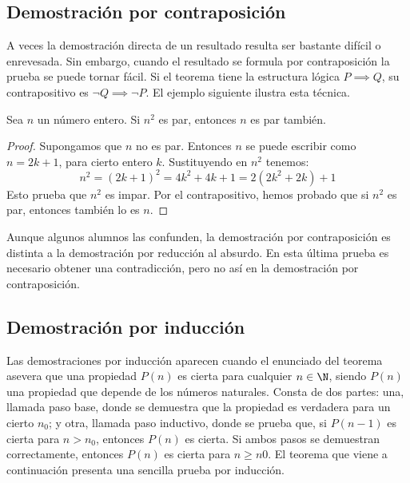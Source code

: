 \subsection{Demostración por contraposición}

A veces la demostración directa de un resultado resulta ser bastante difícil o enrevesada.
Sin embargo, cuando el resultado se formula por contraposición la prueba se puede tornar fácil.
Si el teorema tiene la estructura lógica $P \implies Q$, su contrapositivo es $\neg Q \implies \neg P$.
El ejemplo siguiente ilustra esta técnica.

\begin{theorem}
    Sea $n$ un número entero.
    Si $n^2$ es par, entonces $n$ es par también.
\end{theorem}
\begin{proof}
    Supongamos que $n$ no es par.
    Entonces $n$ se puede escribir como $n = 2k + 1$, para cierto entero $k$.
    Sustituyendo en $n^2$ tenemos:
    \[
        n^2 = (2k + 1)^2 = 4k^2 + 4k + 1 = 2(2k^2 + 2k) + 1
    \]
    Esto prueba que $n^2$ es impar.
    Por el contrapositivo, hemos probado que si $n^2$ es par, entonces también lo es $n$.
\end{proof}

Aunque algunos alumnos las confunden, la demostración por contraposición es distinta a la demostración por reducción al absurdo. En esta última prueba es necesario obtener una contradicción, pero no así en la demostración por contraposición.


\subsection{Demostración por inducción}

Las demostraciones por inducción aparecen cuando el enunciado del teorema asevera que una propiedad $P(n)$ es cierta para cualquier $n \in \N$, siendo $P(n)$ una propiedad que depende de los números naturales.
Consta de dos partes: una, llamada paso base, donde se demuestra que la propiedad es verdadera para un cierto $n_0$;
y otra, llamada paso inductivo, donde se prueba que, si $P(n - 1)$ es cierta para $n > n_0$, entonces $P(n)$ es cierta.
Si ambos pasos se demuestran correctamente, entonces $P(n)$ es cierta para $n \geq n0$.
El teorema que viene a continuación presenta una sencilla prueba por inducción.

